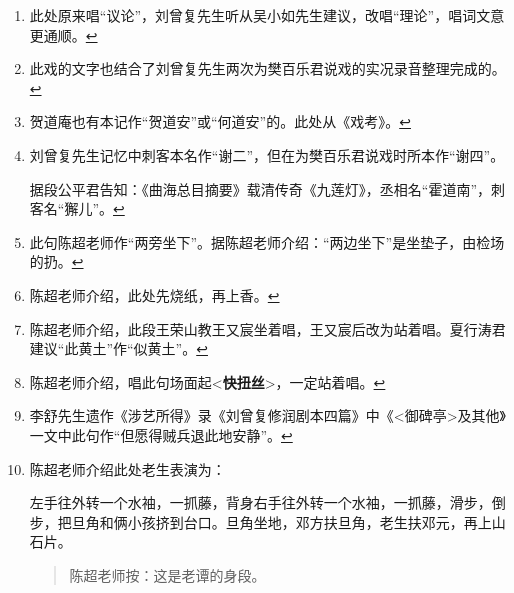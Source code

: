 \begin{enumerate}
\item
  \leavevmode\hypertarget{fn297}{}%
  此处原来唱``议论''，刘曾复先生听从吴小如先生建议，改唱``理论''，唱词文意更通顺。\protect\hyperlink{fnref297}{↩}
\item
  \leavevmode\hypertarget{fn298}{}%
  此戏的文字也结合了刘曾复先生两次为樊百乐君说戏的实况录音整理完成的。\protect\hyperlink{fnref298}{↩}
\item
  \leavevmode\hypertarget{fn299}{}%
  贺道庵也有本记作``贺道安''或``何道安''的。此处从《戏考》。\protect\hyperlink{fnref299}{↩}
\item
  \leavevmode\hypertarget{fn300}{}%
  刘曾复先生记忆中刺客本名作``谢二''，但在为樊百乐君说戏时所本作``谢四''。

  据段公平君告知：《曲海总目摘要》载清传奇《九莲灯》，丞相名``霍道南''，刺客名``獬儿''。\protect\hyperlink{fnref300}{↩}
\item
  \leavevmode\hypertarget{fn301}{}%
  此句陈超老师作``两旁坐下''。据陈超老师介绍：``两边坐下''是坐垫子，由检场的扔。\protect\hyperlink{fnref301}{↩}
\item
  \leavevmode\hypertarget{fn302}{}%
  陈超老师介绍，此处先烧纸，再上香。\protect\hyperlink{fnref302}{↩}
\item
  \leavevmode\hypertarget{fn303}{}%
  陈超老师介绍，此段王荣山教王又宸坐着唱，王又宸后改为站着唱。夏行涛君建议``此黄土''作``似黄土''。\protect\hyperlink{fnref303}{↩}
\item
  \leavevmode\hypertarget{fn304}{}%
  陈超老师介绍，唱此句场面起\textless{}\textbf{快扭丝}\textgreater{}，一定站着唱。\protect\hyperlink{fnref304}{↩}
\item
  \leavevmode\hypertarget{fn305}{}%
  李舒先生遗作《涉艺所得》录《刘曾复修润剧本四篇》中《\textless{}御碑亭\textgreater{}及其他》一文中此句作``但愿得贼兵退此地安静''。\protect\hyperlink{fnref305}{↩}
\item
  \leavevmode\hypertarget{fn306}{}%
  陈超老师介绍此处老生表演为：

  左手往外转一个水袖，一抓藤，背身右手往外转一个水袖，一抓藤，滑步，倒步，把旦角和俩小孩挤到台口。旦角坐地，邓方扶旦角，老生扶邓元，再上山石片。

  \begin{quote}
  陈超老师按：这是老谭的身段。
  \end{quote}


\end{enumerate}
